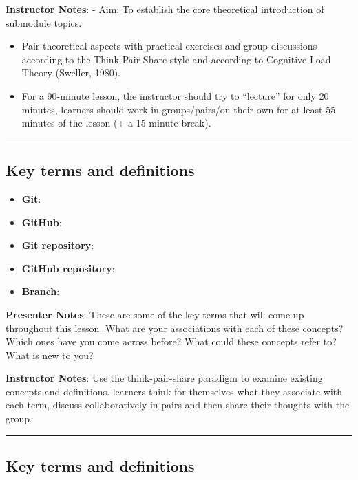\documentclass[
  letterpaper,
  DIV=11,
  numbers=noendperiod]{scrartcl}
\providecommand{\tightlist}{%
  \setlength{\itemsep}{0pt}\setlength{\parskip}{0pt}}
\begin{document}
\textbf{Instructor Notes}: - Aim: To establish the core theoretical
introduction of submodule topics.

\begin{itemize}
\item
  Pair theoretical aspects with practical exercises and group
  discussions according to the Think-Pair-Share style and according to
  Cognitive Load Theory (Sweller, 1980).
\item
  For a 90-minute lesson, the instructor should try to ``lecture'' for
  only 20 minutes, learners should work in groups/pairs/on their own for
  at least 55 minutes of the lesson (+ a 15 minute break).
\end{itemize}

\begin{center}\rule{0.5\linewidth}{0.5pt}\end{center}

\subsection{Key terms and definitions}\label{key-terms-and-definitions}

\begin{itemize}
\tightlist
\item
  \textbf{Git}:\\
\item
  \textbf{GitHub}:
\item
  \textbf{Git repository}:
\item
  \textbf{GitHub repository}:
\item
  \textbf{Branch}:
\end{itemize}

\textbf{Presenter Notes}: These are some of the key terms that will come
up throughout this lesson. What are your associations with each of these
concepts? Which ones have you come across before? What could these
concepts refer to? What is new to you?

\textbf{Instructor Notes}: Use the think-pair-share paradigm to examine
existing concepts and definitions. learners think for themselves what
they associate with each term, discuss collaboratively in pairs and then
share their thoughts with the group.

\begin{center}\rule{0.5\linewidth}{0.5pt}\end{center}

\subsection{Key terms and
definitions}\label{key-terms-and-definitions-1}
\end{document}
